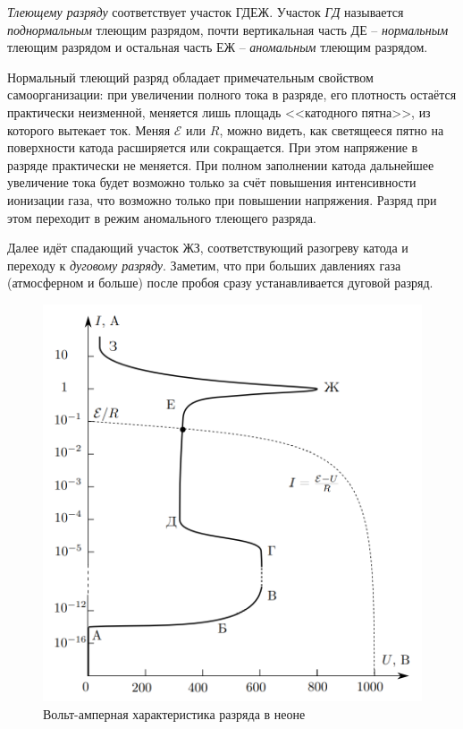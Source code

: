 \documentclass[a4paper, 12pt]{article}
\begin{document}
    \textit{Тлеющему разряду} соответствует участок ГДЕЖ. Участок \textit{ГД} называется \textit{поднормальным} тлеющим разрядом, почти вертикальная часть ДЕ -- \textit{нормальным} тлеющим разрядом и остальная часть ЕЖ -- \textit{аномальным} тлеющим разрядом.
    
    Нормальный тлеющий разряд обладает примечательным свойством самоорганизации: при увеличении полного тока в разряде, его плотность остаётся практически неизменной, меняется лишь площадь <<катодного пятна>>, из которого вытекает ток. Меняя $\mathcal{E}$ или $R$, можно видеть, как светящееся пятно на поверхности катода расширяется или сокращается. При этом напряжение в разряде практически не меняется. При полном заполнении катода дальнейшее увеличение тока будет возможно только за счёт повышения интенсивности ионизации газа, что возможно только при повышении напряжения. Разряд при этом переходит в режим аномального тлеющего разряда.
    
    Далее идёт спадающий участок ЖЗ, соответствующий разогреву катода и переходу к \textit{дуговому разряду}. Заметим, что при больших давлениях газа (атмосферном и больше) после пробоя сразу устанавливается дуговой разряд.
    
    \begin{figure}[H]
        \centering
        \includegraphics[width = 14 cm]{images/theor_graph_VAC.png}
        \caption{Вольт-амперная характеристика разряда в неоне} 
        \label{graph:theor_VAC}
    \end{figure}
\end{document}
